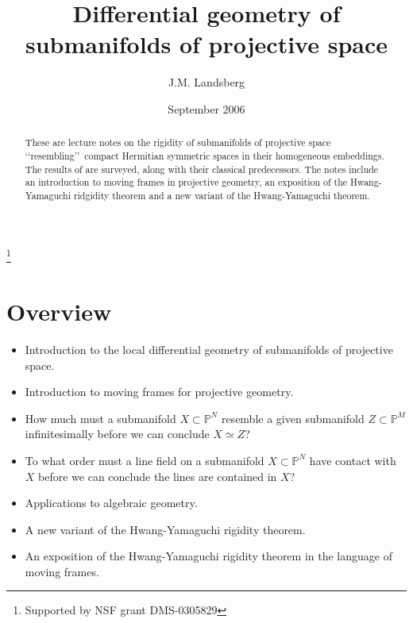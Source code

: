 \documentclass[11pt]{amsart}
\theoremstyle{definition}
\theoremstyle{remark}
\numberwithin{equation}{section}
\def\BP{\mathbb P}
\begin{document}
\title{Differential geometry of submanifolds of projective space}
\author{J.M. Landsberg }
\date{September 2006}
\begin{abstract} These are lecture notes on the   rigidity
of submanifolds of projective space \lq\lq resembling\rq\rq\ 
compact Hermitian symmetric spaces in their homogeneous embeddings.
The results of \cite{Lrigid,Lchss,LR,Lline,Lnfac,HY,robles} are
surveyed, along with their classical predecessors. The notes
include an introduction to moving frames in projective geometry,
an exposition of the Hwang-Yamaguchi ridgidity theorem and
  a new variant of the Hwang-Yamaguchi theorem.
\end{abstract}
\thanks{Supported by NSF grant DMS-0305829}
\maketitle

    
 

\section{Overview}
\begin{itemize}
\item Introduction to the local differential geometry of submanifolds of projective space.
\item Introduction to   moving frames for projective geometry.
\item   How much must a submanifold $X\subset \BP^N$ resemble 
a given submanifold $Z\subset \BP^M$ infinitesimally before
we can conclude $X\simeq Z$?
\item   To what order must a line field on a submanifold $X\subset \BP^N$ have
contact with $X$ before we can conclude the lines are contained in $X$?
\item Applications to algebraic geometry.
\item A new variant of the Hwang-Yamaguchi rigidity theorem.
\item An exposition of the Hwang-Yamaguchi rigidity theorem in the language
of moving frames.
\end{itemize}
\end{document}

